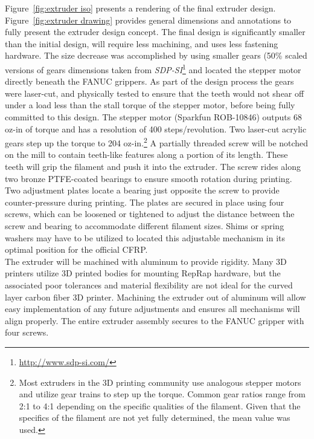 Figure~\ref{fig:extruder iso} presents a rendering of the final extruder design. Figure~\ref{fig:extruder drawing} provides general dimensions and annotations to fully present the extruder design concept. The final design is significantly smaller than the initial design, will require less machining, and uses less fastening hardware. The size decrease was accomplished by using smaller gears (50\% scaled versions of gears dimensions taken from \emph{SDP-SI}\footnote{\url{http://www.sdp-si.com/}} and located the stepper motor directly beneath the FANUC grippers. As part of the design process the gears were laser-cut, and physically tested to ensure that the teeth would not shear off under a load less than the stall torque of the stepper motor, before being fully committed to this design. The stepper motor (Sparkfun ROB-10846) outputs 68 oz-in of torque and has a resolution of 400 steps/revolution. Two laser-cut acrylic gears step up the torque to 204 oz-in.\footnote{Most extruders in the 3D printing community use analogous stepper motors and utilize gear trains to step up the torque. Common gear ratios range from 2:1 to 4:1 depending on the specific qualities of the filament. Given that the specifics of the filament are not yet fully determined, the mean value was used.} A partially threaded screw will be notched on the mill to contain teeth-like features along a portion of its length. These teeth will grip the filament and push it into the extruder. The screw rides along two bronze PTFE-coated bearings to ensure smooth rotation during printing. Two adjustment plates locate a bearing just opposite the screw to provide counter-pressure during printing. The plates are secured in place using four screws, which can be loosened or tightened to adjust the distance between the screw and bearing to accommodate different filament sizes. Shims or spring washers may have to be utilized to located this adjustable mechanism in its optimal position for the official CFRP.\\

The extruder will be machined with aluminum to provide rigidity. Many 3D printers utilize 3D printed bodies for mounting RepRap hardware, but the associated poor tolerances and material flexibility are not ideal for the curved layer carbon fiber 3D printer. Machining the extruder out of aluminum will allow easy implementation of any future adjustments and ensures all mechanisms will align properly. The entire extruder assembly secures to the FANUC gripper with four screws.\\

